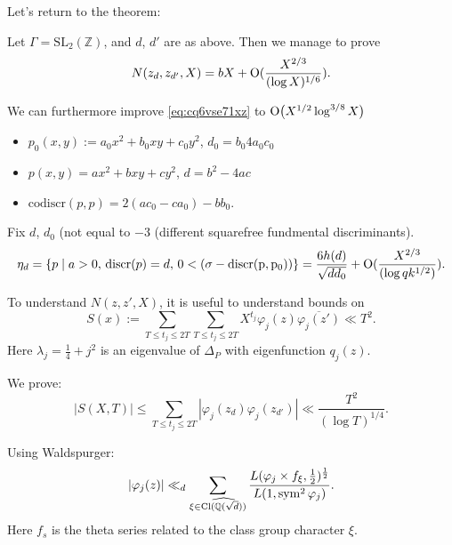 \documentclass[reqno]{amsart} 
\begin{document}
Let's return to the theorem:
\begin{theorem}
  Let $\Gamma = \mathrm{SL}_2(\mathbb{Z})$, and $d$, $d'$ are as above.  Then we manage to prove
  \begin{equation*}
    N(z_d, z_{d'}, X) = b X + \operatorname{O}(\frac{X^{2/3}}{(\log X)^{1/6}}).
  \end{equation*}
\end{theorem}
We can furthermore  improve \eqref{eq:cq6vse71xz} to $\operatorname{O}\bigl(X^{1/2} \log^{3/8} X\bigr)$
\begin{itemize}
\item $p_0(x, y) := a_0 x^2 + b_0 x y + c_0 y^2$, $d_0 = b_0 4 a_0 c_0$
\item $p(x, y) = a x^2 + b x y + c y^2$, $d = b^2 - 4 a c$
\item $\mathrm{codiscr}(p, p) = 2(a c_0 - c a_0) - b b_0$.
\end{itemize}
\begin{corollary}
  Fix $d$, $d_0$ (not equal to $-3$ (different squarefree fundmental discriminants).
  \begin{equation*}
    \eta_d = \left\{ p \mid a > 0, \, \text{discr}(p) = d,
      \,
      0 <(\sigma - \operatorname{discr(p, p_0)})\right\}
    = \frac{6 h(d)}{ \sqrt{d d_0}}
    + \operatorname{O}(\frac{X^{2/3}}{(\log q k^{1/2})}).
  \end{equation*}
\end{corollary}
To understand $N(z, z', X)$, it is useful to understand bounds on
\begin{equation*}
  S(x) := \sum_{T \leq t_j \leq 2 T}
  \sum_{T \leq t_j \leq 2 T}
  X^{t_j}
  \varphi_j(z) \overline{\varphi_j(z ')}
  \ll T^2.
\end{equation*}
Here $\lambda_j = \tfrac{1}{4} + j^2$ is an eigenvalue of $\Delta_P$ with eigenfunction $q_j(z)$.

We prove:
\begin{equation*}
  \lvert S(X, T) \rvert
  \leq \sum_{T \leq t_j \leq 2 T}
  \left\lvert \varphi_{j}(z_d) \varphi_j(z_{d '}) \right\rvert
  \ll \frac{T^2}{(\log T)^{1/4}}.
\end{equation*}

Using Waldspurger:
\begin{equation*}
  \lvert \varphi_j(z) \rvert \ll_d  \sum_{\xi \in \widehat{\mathrm{Cl}(\mathbb{Q}(\sqrt{d}))}}
  \frac{L(\varphi_j \times f_\xi, \frac{1}{2})^{\frac{1}{2}}}{L(1, \operatorname{sym}^2 \varphi_j)}.
\end{equation*}
Here $f_s$ is the theta series related to the class group character $\xi$.
\end{document}
